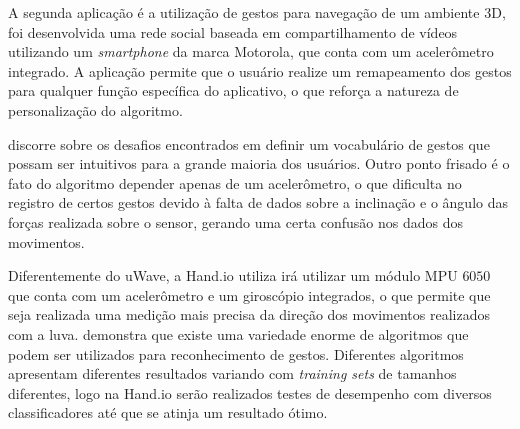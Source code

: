 A segunda aplicação é a utilização de gestos para navegação de um ambiente 3D, foi desenvolvida uma rede social baseada em compartilhamento de vídeos utilizando um \textit{smartphone} da marca Motorola, que conta com um acelerômetro integrado. A aplicação permite que o usuário realize um remapeamento dos gestos para qualquer função específica do aplicativo, o que reforça a natureza de personalização do algoritmo.

 discorre sobre os desafios encontrados em definir um vocabulário de gestos que possam ser intuitivos para a grande maioria dos usuários. Outro ponto frisado é o fato do algoritmo depender apenas de um acelerômetro, o que dificulta no registro de certos gestos devido à falta de dados sobre a inclinação e o ângulo das forças realizada sobre o sensor, gerando uma certa confusão nos dados dos movimentos.

Diferentemente do uWave, a Hand.io utiliza irá utilizar um módulo MPU $6050$ \cite{invensense} que conta com um acelerômetro e um giroscópio integrados, o que permite que seja realizada uma medição mais precisa da direção dos movimentos realizados com a luva.  demonstra que existe uma variedade enorme de algoritmos que podem ser utilizados para reconhecimento de gestos. Diferentes algoritmos apresentam diferentes resultados variando com \textit{training sets} de tamanhos diferentes, logo na Hand.io serão realizados testes de desempenho com diversos classificadores até que se atinja um resultado ótimo.

